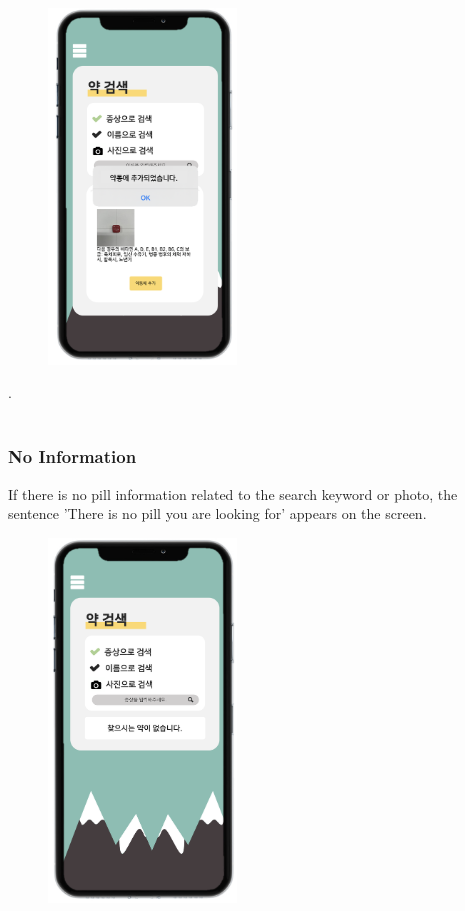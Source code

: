 \documentclass[conference]{IEEEtran}
\begin{document}
\begin{figure}[h!]
\centering
\includegraphics[width=5cm]{final_image_folder/search_add.png}
\caption{}
\label{fig:map}
\end{figure}
.\\
\\

\subsubsection{No Information}
If there is no pill information related to the search keyword or photo, the sentence 'There is no pill you are looking for' appears on the screen.\\

\begin{figure}[h!]
\centering
\includegraphics[width=5cm]{final_image_folder/search_noresult.png}
\caption{}
\label{fig:map}
\end{figure}
\end{document}
